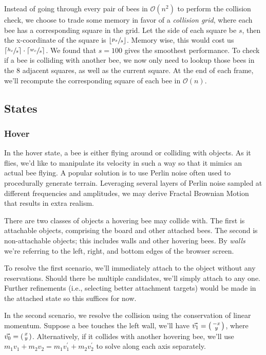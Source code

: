 \documentclass[a4paper,10pt]{article}
\begin{document}
\begin{multicols}{2}
    Instead of going through every pair of bees in $\mathcal{O}(n^{2})$ to perform the collision
    check, we choose to trade some memory in favor of a \textit{collision grid}, where each
    bee has a corresponding square in the grid. Let the side of each square be $s$, then
    the x-coordinate of the square is $\lfloor \sfrac{p_{x}}{s} \rfloor$. Memory wise,
    this would cost us $\lceil \sfrac{h_{c}}{s} \rceil \cdot \lceil \sfrac{w_{c}}{s} \rceil$.
    We found that $s = 100$ gives the smoothest performance. To check if a bee is colliding
    with another bee, we now only need to lookup those bees in the $8$ adjacent squares, as
    well as the current square. At the end of each frame, we'll recompute the corresponding
    square of each bee in $\mathcal{O}(n)$.

    \subsection{States}
    \subsubsection{Hover}
    In the hover state, a bee is either flying around or colliding with objects.
    As it flies, we'd like to manipulate its velocity in such a way so that it
    mimics an actual bee flying. A popular solution is to use Perlin noise
    \cite{perlin2002improving} often used to procedurally generate terrain.
    Leveraging several layers of Perlin noise sampled at different frequencies
    and amplitudes, we may derive Fractal Brownian Motion that results in
    extra realism.

    There are two classes of objects a hovering bee may collide with. The first is
    attachable objects, comprising the board and other attached bees. The second is
    non-attachable objects; this includes walls and other hovering bees. By \textit{walls}
    we're referring to the left, right, and bottom edges of the browser screen.

    To resolve the first scenario, we'll immediately attach to the object without any
    reservations. Should there be multiple candidates, we'll simply attach to any one.
    Further refinements (i.e., selecting better attachment targets) would be made in
    the attached state so this suffices for now.

    In the second scenario, we resolve the collision using the conservation of linear momentum.
    Suppose a bee touches the left wall, we'll have $\vec{v_{1}} = \begin{psmallmatrix} -x \\ y \end{psmallmatrix}$,
    where $\vec{v_{0}} = \begin{psmallmatrix} x \\ y \end{psmallmatrix}$. Alternatively, if
    it collides with another hovering bee, we'll use $m_{1}v_{1} + m_{2}v_{2} = m_{1}v_{1}^{\prime} + m_{2}v_{2}^{\prime}$
    to solve along each axis separately.


\end{multicols}
\end{document}
